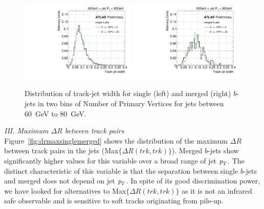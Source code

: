 \begin{figure}[tp]
\centering
\includegraphics[width=0.49\textwidth]{FIGS/systematics/trkWidthsingle_060.pdf}
\includegraphics[width=0.49\textwidth]{FIGS/systematics/trkWidthmerged_060.pdf}
\caption{Distribution of track-jet width for single (left) and merged (right) $b$-jets in two bins of Number of Primary Vertices for jets between 60~GeV to 80~GeV.}
\label{fig:trkwidthpileup}
\end{figure}



{ \em III. Maximum $\Delta R$ between track pairs}
\\[3mm]
Figure~\ref{fig:drmaxsinglemerged} shows the distribution of the maximum $\Delta R$ between track pairs in the jets (Max$\{\Delta R(trk,trk)\}$). Merged $b$-jets show significantly higher values for this variable over a broad range of jet ${\emph{p}_{T}}$. The distinct characteristic of this variable is that the separation between single $b$-jets and merged does not depend on jet ${\emph{p}_{T}}$. In spite of its good discrimination power, we have looked for alternatives to Max$\{\Delta R(trk,trk)\}$ as it is not an infrared safe observable and is sensitive to soft tracks originating from pile-up. 
\\[3mm]

